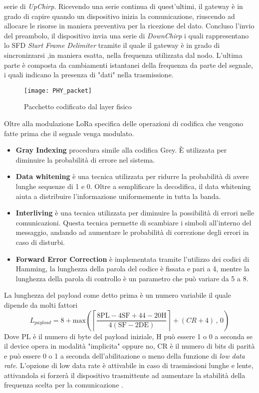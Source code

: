 serie di \emph{UpChirp}. Ricevendo una serie continua di quest'ultimi, il gateway è in grado di capire
quando un dispositivo inizia la comunicazione, riuscendo  ad
allocare le risorse in maniera preventiva per la ricezione del dato. 
Concluso l'invio del preambolo, il dispositivo invia  una serie di
\emph{DownChirp} i quali rappresentano lo SFD \emph{Start Frame Delimiter} tramite il quale il gateway è in
grado di sincronizzarsi ,in maniera esatta, nella frequenza utilizzata dal
nodo.
L'ultima parte è composta da cambiamenti istantanei della frequenza da parte
del segnale, i quali indicano la presenza di "dati" nella trasmissione. 
\begin{figure}[ht]
        \centering 
                \texttt{[image: PHY\_packet]}
        \caption{Pacchetto codificato dal layer fisico}
        \label{fig:freq_lora_chirp}
\end{figure}
Oltre alla modulazione LoRa specifica delle operazioni di codifica che vengono
fatte prima che il segnale venga modulato.
\begin{itemize}
        \item   \textbf{Gray Indexing} procedura simile alla codifica Grey. È
                utilizzata per diminuire la probabilità di errore nel sistema.
        \item   \textbf{Data whitening} è una tecnica utilizzata per ridurre la
                probabilità di avere lunghe sequenze di 1 e 0. Oltre a semplificare la
                decodifica, il data whitening aiuta a distribuire l'informazione 
                uniformemente in tutta la banda.
        \item   \textbf{Interliving} è una tecnica utilizzata per diminuire la
                possibilità di errori nelle comunicazioni. Questa tecnica
                permette di scambiare i simboli all'interno del messaggio,
                andando ad aumentare le probabilità di correzione degli errori
                in caso di disturbi. 
        \item   \textbf{Forward Error Correction} è implementata tramite
                l'utilizzo dei codici di Hamming, la lunghezza della parola del codice è
                fissata e pari a 4, mentre la lunghezza della parola di
                controllo è un parametro che può variare da 5 a 8.
\end{itemize}
La lunghezza del payload come detto prima è un numero variabile il quale dipende
da molti fattori 
\begin{equation}
        L_{payload} = 8+
        \text{max}\left(\left\lceil\frac{8\text{PL}-4\text{SF}+44-20\text{H}}{4(\text{SF}-2\text{DE})}
        \right\rceil+(CR+4)\, , \, 0 \right)
\end{equation}
Dove $\text{PL}$ è il numero di byte del payload iniziale, $\text{H}$ può essere
1 o 0 a seconda se il device opera in modalità "implicita" oppure no,
$\text{CR}$ è il numero di bits di parità e  può essere 0 o 1 a seconda
dell'abilitazione o meno della funzione di \emph{low data rate}.
L'opzione di low data rate è attivabile in caso di trasmissioni lunghe e lente,
attivandola si forzerà il dispositivo trasmittente ad aumentare la stabilità
della frequenza scelta per la comunicazione .


